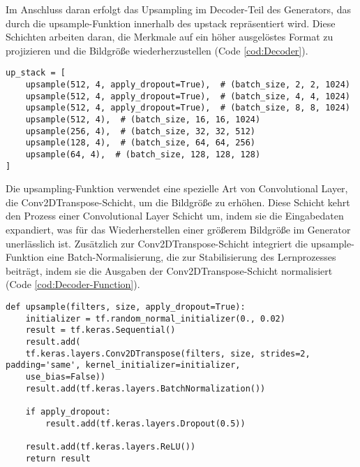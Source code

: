 Im Anschluss daran erfolgt das Upsampling im Decoder-Teil des Generators, das durch die upsample-Funktion innerhalb des upstack repräsentiert wird. Diese Schichten arbeiten daran, die Merkmale auf ein höher ausgelöstes Format zu projizieren und die Bildgröße wiederherzustellen (Code \ref{cod:Decoder}).

\begin{lstlisting}[language=pyhaff, caption={Upsampling-Schritt in Pix2Pix}, label={cod:Decoder}]
up_stack = [
	upsample(512, 4, apply_dropout=True),  # (batch_size, 2, 2, 1024)
	upsample(512, 4, apply_dropout=True),  # (batch_size, 4, 4, 1024)
	upsample(512, 4, apply_dropout=True),  # (batch_size, 8, 8, 1024)
	upsample(512, 4),  # (batch_size, 16, 16, 1024)
	upsample(256, 4),  # (batch_size, 32, 32, 512)
	upsample(128, 4),  # (batch_size, 64, 64, 256)
	upsample(64, 4),  # (batch_size, 128, 128, 128)
]
\end{lstlisting}

Die upsampling-Funktion verwendet eine spezielle Art von Convolutional Layer, die Conv2DTranspose-Schicht, um die Bildgröße zu erhöhen. Diese Schicht kehrt den Prozess einer Convolutional Layer Schicht um, indem sie die Eingabedaten expandiert, was für das Wiederherstellen einer größerem Bildgröße im Generator unerlässlich ist. Zusätzlich zur Conv2DTranspose-Schicht integriert die upsample-Funktion eine Batch-Normalisierung, die zur Stabilisierung des Lernprozesses beiträgt, indem sie die Ausgaben der Conv2DTranspose-Schicht normalisiert (Code \ref{cod:Decoder-Function}). 

\begin{lstlisting}[language=pyhaff, caption={Upsampling-Schritt in Pix2Pix}, label={cod:Decoder-Function}]
def upsample(filters, size, apply_dropout=True):
	initializer = tf.random_normal_initializer(0., 0.02)
	result = tf.keras.Sequential()
	result.add(
	tf.keras.layers.Conv2DTranspose(filters, size, strides=2, padding='same', kernel_initializer=initializer, 
	use_bias=False))
	result.add(tf.keras.layers.BatchNormalization())
	
	if apply_dropout:
		result.add(tf.keras.layers.Dropout(0.5))
	
	result.add(tf.keras.layers.ReLU())
	return result
\end{lstlisting} 

